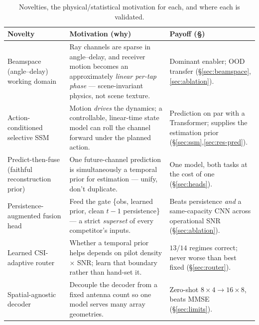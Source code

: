 \documentclass[11pt]{article}
\begin{document}
\begin{table}[h]
\centering\small
\renewcommand{\arraystretch}{1.15}
\begin{tabular}{@{}p{}p{}p{}@{}}
\toprule
\textbf{Novelty} & \textbf{Motivation (why)} & \textbf{Payoff (\S)} \\
\midrule
Beamspace (angle--delay) working domain & Ray channels are sparse in angle--delay, and receiver motion becomes an approximately \emph{linear per-tap phase} --- scene-invariant physics, not scene texture. & Dominant enabler; OOD transfer (\S\ref{sec:beamspace},\ref{sec:ablation}). \\
Action-conditioned selective SSM & Motion \emph{drives} the dynamics; a controllable, linear-time state model can roll the channel forward under the planned action. & Prediction on par with a Transformer; supplies the estimation prior (\S\ref{sec:ssm},\ref{sec:res-pred}). \\
Predict-then-fuse (faithful reconstruction prior) & One future-channel prediction is simultaneously a temporal prior for estimation --- unify, don't duplicate. & One model, both tasks at the cost of one (\S\ref{sec:heads}). \\
Persistence-augmented fusion head & Feed the gate \{obs, learned prior, clean $t{-}1$ persistence\} --- a strict \emph{superset} of every competitor's inputs. & Beats persistence \emph{and} a same-capacity CNN across operational SNR (\S\ref{sec:ablation}). \\
Learned CSI-adaptive router & Whether a temporal prior helps depends on pilot density $\times$ SNR; learn that boundary rather than hand-set it. & $13/14$ regimes correct; never worse than best fixed (\S\ref{sec:router}). \\
Spatial-agnostic decoder & Decouple the decoder from a fixed antenna count so one model serves many array geometries. & Zero-shot $8\times4\!\to\!16\times8$, beats MMSE (\S\ref{sec:limits}). \\
\bottomrule
\end{tabular}
\caption{Novelties, the physical/statistical motivation for each, and where each is validated.}
\label{tab:novelty}
\end{table}
\end{document}
